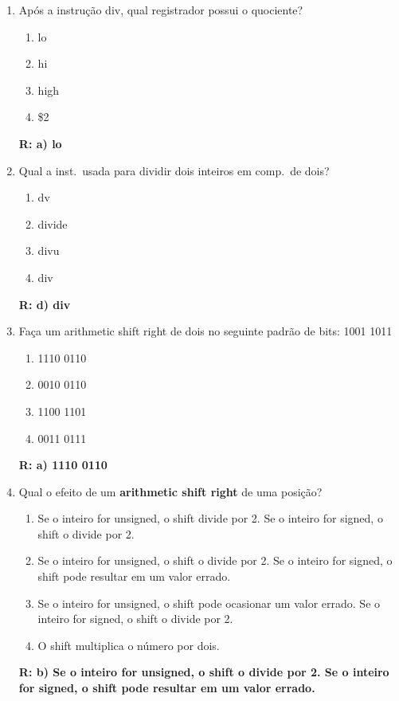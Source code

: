\documentclass[a4paper,11pt,fleqn]{article}
\begin{document}
\begin{enumerate}
    \item{Após a instrução div, qual registrador possui o quociente?}
        \begin{enumerate}
            \item{lo}
            \item{hi}
            \item{high}
            \item{\$2}
        \end{enumerate}
        \textbf{R: a) lo }

    \item{Qual a inst.\ usada para dividir dois inteiros em comp.\ de dois?}
        \begin{enumerate}
            \item{dv}
            \item{divide}
            \item{divu}
            \item{div}
        \end{enumerate}
        \textbf{R: d) div}

    \item{Faça um arithmetic shift right de dois no seguinte padrão de bits: 1001 1011}
        \begin{enumerate}
            \item{1110 0110}
            \item{0010 0110}
            \item{1100 1101}
            \item{0011 0111}
        \end{enumerate}
        \textbf{R: a) 1110 0110}

    \item{Qual o efeito de um \textbf{arithmetic shift right} de uma posição?}
        \begin{enumerate}
            \item{Se o inteiro for unsigned, o shift divide por 2. Se o inteiro for signed, o shift o
                    divide por 2.}
            \item{Se o inteiro for unsigned, o shift o divide por 2. Se o inteiro for signed, o shift
                    pode resultar em um valor errado.}
            \item{Se o inteiro for unsigned, o shift pode ocasionar um valor errado. Se o inteiro for
                    signed, o shift o divide por 2.}
            \item{O shift multiplica o número por dois.}
        \end{enumerate}
        \textbf{R: b) Se o inteiro for unsigned, o shift o divide por 2. Se o inteiro for signed, o shift
                    pode resultar em um valor errado.}
        \newpage


\end{enumerate}
\end{document}

